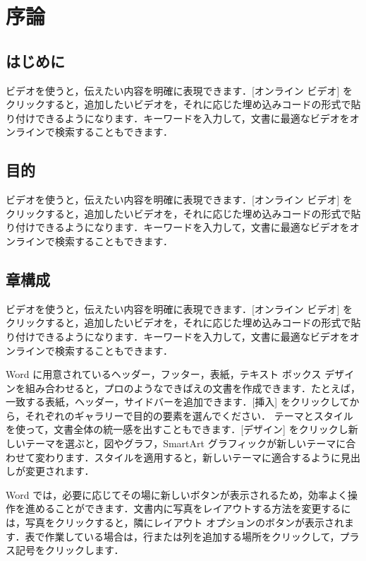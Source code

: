 \chapter{序論}	%
\thispagestyle{plain}   %


\section{はじめに}
ビデオを使うと，伝えたい内容を明確に表現できます．[オンライン ビデオ] をクリックすると，追加したいビデオを，それに応じた埋め込みコードの形式で貼り付けできるようになります．キーワードを入力して，文書に最適なビデオをオンラインで検索することもできます．

\section{目的}
ビデオを使うと，伝えたい内容を明確に表現できます．[オンライン ビデオ] をクリックすると，追加したいビデオを，それに応じた埋め込みコードの形式で貼り付けできるようになります．キーワードを入力して，文書に最適なビデオをオンラインで検索することもできます．

\section{章構成}

ビデオを使うと，伝えたい内容を明確に表現できます．[オンライン ビデオ] をクリックすると，追加したいビデオを，それに応じた埋め込みコードの形式で貼り付けできるようになります．キーワードを入力して，文書に最適なビデオをオンラインで検索することもできます．

Word に用意されているヘッダー，フッター，表紙，テキスト ボックス デザインを組み合わせると，プロのようなできばえの文書を作成できます．たとえば，一致する表紙，ヘッダー，サイドバーを追加できます．[挿入] をクリックしてから，それぞれのギャラリーで目的の要素を選んでください．
テーマとスタイルを使って，文書全体の統一感を出すこともできます．[デザイン] をクリックし新しいテーマを選ぶと，図やグラフ，SmartArt グラフィックが新しいテーマに合わせて変わります．スタイルを適用すると，新しいテーマに適合するように見出しが変更されます．

Word では，必要に応じてその場に新しいボタンが表示されるため，効率よく操作を進めることができます．文書内に写真をレイアウトする方法を変更するには，写真をクリックすると，隣にレイアウト オプションのボタンが表示されます．表で作業している場合は，行または列を追加する場所をクリックして，プラス記号をクリックします．


